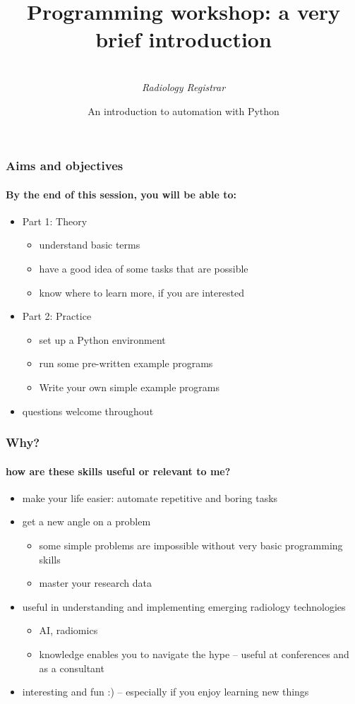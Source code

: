 \documentclass{beamer}
\title[Programming workshop]{Programming workshop: a very brief introduction}
\author{
	\sc{Mark Thurston}\\
    \textit{Radiology Registrar}
}
\institute{
	\textit{Peninsula Radiology Academy}\\
    \textit{Plymouth}
}
\date[April 2018]{An introduction to automation with Python} %
\begin{document}
    \begin{frame}[plain]
	    \titlepage
    \end{frame}


    \begin{frame}
	    \frametitle{Aims and objectives}
	    \framesubtitle{By the end of this session, you will be able to:}

	    \begin{itemize}
		    \item Part 1: Theory
			    \begin{itemize}
				    \item understand basic terms
				    \item have a good idea of some tasks that are possible
				    \item know where to learn more, if you are interested
			    \end{itemize}
	    \end{itemize}
	    \begin{itemize}
		    \item Part 2: Practice
			    \begin{itemize}
				    \item set up a Python environment
				    \item run some pre-written example programs
				    \item Write your own simple example programs
			    \end{itemize}
	    \end{itemize}
	    \begin{itemize}
		    \item questions welcome throughout
	    \end{itemize}
    \end{frame}

    \begin{frame}
	    \frametitle{Why?}
	    \framesubtitle{how are these skills useful or relevant to me?}
	    \begin{itemize}
		    \item make your life easier: automate repetitive and boring tasks
		    \item get a new angle on a problem
			    \begin{itemize}
				    \item some simple problems are impossible without very basic programming skills
				    \item master your research data
			    \end{itemize}
		    \item useful in understanding and implementing emerging radiology technologies
			    \begin{itemize}
				    \item AI, radiomics
				    \item knowledge enables you to navigate the hype -- useful at conferences and as a consultant
			    \end{itemize}
		    \item interesting and fun :) -- especially if you enjoy learning new things
	    \end{itemize}
    \end{frame}
\end{document}

